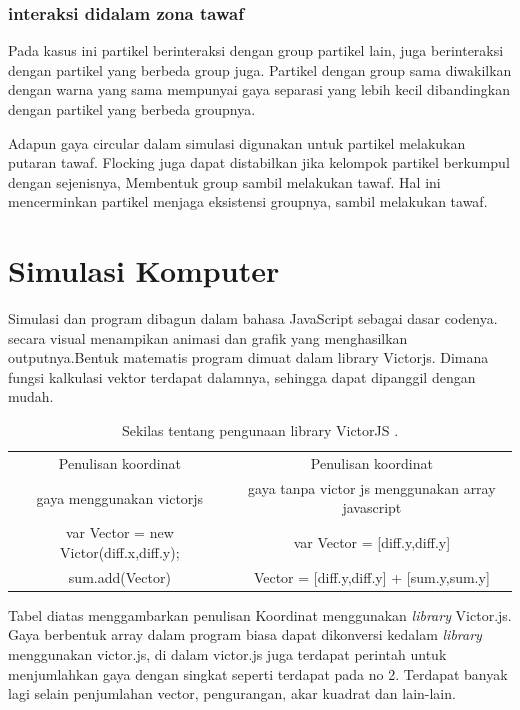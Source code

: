 \subsubsection{interaksi didalam zona tawaf}
\hspace{0.6cm} Pada kasus ini partikel berinteraksi dengan group partikel lain, juga berinteraksi dengan partikel yang berbeda group juga. Partikel dengan group sama diwakilkan dengan warna yang sama mempunyai gaya separasi yang lebih kecil dibandingkan dengan partikel yang berbeda groupnya. 

Adapun gaya circular dalam simulasi digunakan untuk partikel melakukan putaran tawaf. Flocking juga dapat distabilkan jika kelompok partikel berkumpul dengan sejenisnya, Membentuk group sambil melakukan tawaf. Hal ini mencerminkan partikel menjaga eksistensi groupnya, sambil melakukan tawaf.

\section{Simulasi Komputer}
\hspace{0.6cm}Simulasi dan program dibagun dalam bahasa JavaScript sebagai dasar codenya. secara visual menampikan animasi dan grafik yang menghasilkan outputnya.Bentuk matematis program dimuat dalam library Victorjs. Dimana fungsi kalkulasi vektor terdapat dalamnya, sehingga dapat dipanggil dengan mudah.

\begin{table}
\centering
\caption{Sekilas tentang pengunaan library VictorJS .}
\begin{center}
\begin{tabular}{|c|c|}
\hline
Penulisan koordinat  & Penulisan koordinat\\
gaya menggunakan victorjs &  gaya tanpa victor js menggunakan array javascript\\
\hline
var Vector = new Victor(diff.x,diff.y); & var Vector = [diff.y,diff.y] \\
\hline
\hline
sum.add(Vector) & Vector = [diff.y,diff.y] + [sum.y,sum.y]  \\
\hline
\end{tabular}
\end{center}
\end{table}

\hspace{0.6cm}Tabel diatas menggambarkan penulisan Koordinat menggunakan \emph{library} Victor.js\citep{noauthororeditor2014victorjs}. Gaya berbentuk array dalam program biasa dapat dikonversi kedalam \emph{library} menggunakan victor.js, di dalam victor.js juga terdapat perintah untuk menjumlahkan gaya dengan singkat seperti terdapat pada no 2. Terdapat banyak lagi selain penjumlahan vector, pengurangan, akar kuadrat dan lain-lain.  



